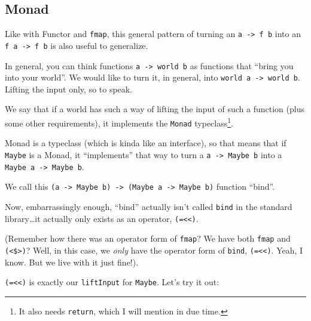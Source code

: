 \documentclass[]{article}
\begin{document}
\subsection{Monad}\label{monad}

Like with Functor and \texttt{fmap}, this general pattern of turning an
\texttt{a\ -\textgreater{}\ f\ b} into an \texttt{f\ a\ -\textgreater{}\ f\ b}
is also useful to generalize.

In general, you can think functions \texttt{a\ -\textgreater{}\ world\ b} as
functions that ``bring you into your world''. We would like to turn it, in
general, into \texttt{world\ a\ -\textgreater{}\ world\ b}. Lifting the input
only, so to speak.

We say that if a world has such a way of lifting the input of such a function
(plus some other requirements), it implements the \texttt{Monad}
typeclass\footnote{It also needs \texttt{return}, which I will mention in due
  time.}.

Monad is a typeclass (which is kinda like an interface), so that means that if
\texttt{Maybe} is a Monad, it ``implements'' that way to turn a
\texttt{a\ -\textgreater{}\ Maybe\ b} into a
\texttt{Maybe\ a\ -\textgreater{}\ Maybe\ b}.

We call this
\texttt{(a\ -\textgreater{}\ Maybe\ b)\ -\textgreater{}\ (Maybe\ a\ -\textgreater{}\ Maybe\ b)}
function ``bind''.

Now, embarrassingly enough, ``bind'' actually isn't called \texttt{bind} in the
standard library\ldots it actually only exists as an operator,
\texttt{(=\textless{}\textless{})}.

(Remember how there was an operator form of \texttt{fmap}? We have both
\texttt{fmap} and \texttt{(\textless{}\$\textgreater{})}? Well, in this case, we
\emph{only} have the operator form of \texttt{bind},
\texttt{(=\textless{}\textless{})}. Yeah, I know. But we live with it just
fine!).

\texttt{(=\textless{}\textless{})} is exactly our \texttt{liftInput} for
\texttt{Maybe}. Let's try it out:
\end{document}
